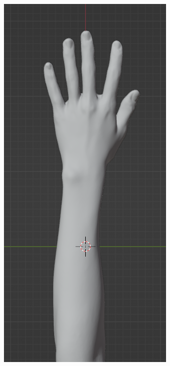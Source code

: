 \documentclass{ltjsarticle}
\begin{document}
\begin{figure}[H]
\begin{minipage}{0.292\columnwidth}
		\end{minipage}
		\hspace{0.3pt}
		\begin{minipage}{0.292\columnwidth}
		\centering
		\includegraphics[width = \columnwidth]{figs/handmeshLat.png}

\end{minipage}
\end{figure}
\end{document}
